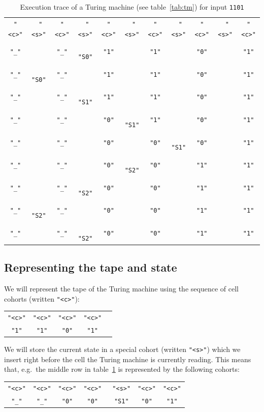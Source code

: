 \documentclass[11pt]{article}
\def\t#1{\texttt{#1}}
\def\h#1{{\tt \color{gray} #1}}
\begin{document}
\begin{table}[b]
  \centering
  \begin{tabular}{ccccccccccc}
    \t{"<c>"}&\h{"<s>"}&\t{"<c>"}&\h{"<s>"}&\t{"<c>"}&\h{"<s>"}&\t{"<c>"}&\h{"<s>"}&\t{"<c>"}&\h{"<s>"}&\t{"<c>"}\\
    \t{"\_"}&        &\t{"\_"}&\h{"S0"}&\t{"1"}&        &\t{"1"}&        &\t{"0"}&                   &\t{"1"}\\
    \t{"\_"}&\h{"S0"}&\t{"\_"}&        &\t{"1"}&        &\t{"1"}&        &\t{"0"}&                   &\t{"1"}\\
    \t{"\_"}&        &\t{"\_"}&\h{"S1"}&\t{"1"}&        &\t{"1"}&        &\t{"0"}&                   &\t{"1"}\\
    \t{"\_"}&        &\t{"\_"}&        &\t{"0"}&\h{"S1"}&\t{"1"}&        &\t{"0"}&                   &\t{"1"}\\
    \t{"\_"}&        &\t{"\_"}&        &\t{"0"}&        &\t{"0"}&\h{"S1"}&\t{"0"}&\hphantom{\t{"S1"}}&\t{"1"}\\
    \t{"\_"}&        &\t{"\_"}&        &\t{"0"}&\h{"S2"}&\t{"0"}&        &\t{"1"}&                   &\t{"1"}\\
    \t{"\_"}&        &\t{"\_"}&\h{"S2"}&\t{"0"}&        &\t{"0"}&        &\t{"1"}&                   &\t{"1"}\\
    \t{"\_"}&\h{"S2"}&\t{"\_"}&        &\t{"0"}&        &\t{"0"}&        &\t{"1"}&                   &\t{"1"}\\
    \t{"\_"}&        &\t{"\_"}&\h{"S2"}&\t{"0"}&        &\t{"0"}&        &\t{"1"}&                   &\t{"1"}
  \end{tabular}
  \caption{Execution trace of a Turing machine (see table~\ref{tab:tm}) for input \t{1101}}
  \label{tab:tmtrace}
\end{table}

\subsection{Representing the tape and state}
We will represent the tape of the Turing machine using the sequence of cell
cohorts (written \t{"<c>"}):
\begin{center}
  \renewcommand{\tabcolsep}{2.5pt}
  \begin{tabular}{ccccc}
    \t{"<c>"} & \t{"<c>"} & \t{"<c>"} & \t{"<c>"} \\
    \t{"1"}   & \t{"1"}   & \t{"0"}   & \t{"1"}  
  \end{tabular}
\end{center}
We will store the current state in a special cohort (written \t{"<s>"}) which we
insert right before the cell the Turing machine is currently reading. This means
that, e.g.\ the middle row in table~\ref{tab:tmtrace} is represented by the
following cohorts:
\begin{center}
  \renewcommand{\tabcolsep}{1pt}
  \begin{tabular}{ccccccc}
    \t{"<c>"} & \t{"<c>"} & \t{"<c>"} & \t{"<c>"} & \h{"<s>"} & \t{"<c>"} & \t{"<c>"} \\
    \t{"\_"}  & \t{"\_"}  & \t{"0"}   & \t{"0"}   & \h{"S1"}  & \t{"0"}   & \t{"1"}
  \end{tabular}
\end{center}
\end{document}
